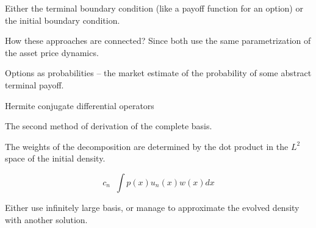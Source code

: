 \documentclass[a4paper]{article}
\newcommand{\defn}{\mathop{\overset{\Delta}{=}}\nolimits}
\begin{document}
Either the terminal boundary condition (like a payoff function for an option) or the initial boundary condition.

How these approaches are connected? Since both use the same parametrization of the asset price dynamics.

Options as probabilities -- the market estimate of the probability of some abstract terminal payoff.

Hermite conjugate differential operators

The second method of derivation of the complete basis.

The weights of the decomposition are determined by the dot product in the $L^2$ space of the initial density.

\[c_n \defn \int p(x) u_n(x) w(x) dx\]

Either use infinitely large basis, or manage to approximate the evolved density with another solution.




\end{document}
